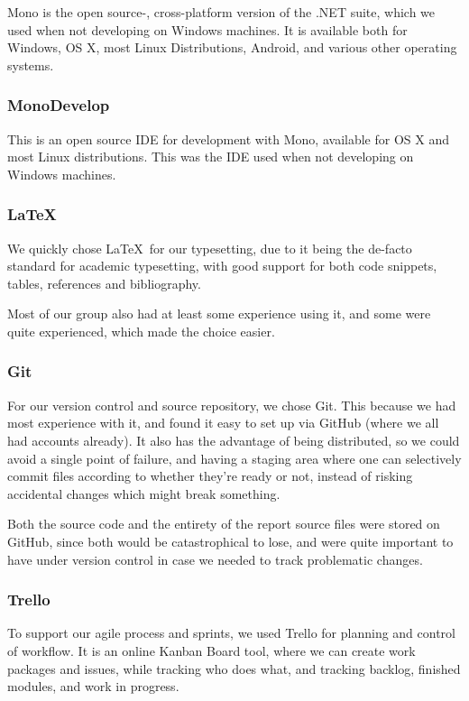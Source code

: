 Mono is the open source-, cross-platform version of the .NET suite, which we used when not developing on Windows machines. It is available both for Windows, OS X, most Linux Distributions, Android, and various other operating systems.

\subsubsection{MonoDevelop}
This is an open source IDE for development with Mono, available for OS X and most Linux distributions. This was the IDE used when not developing on Windows machines.

\subsubsection{\LaTeX}
We quickly chose \LaTeX \ for our typesetting, due to it being the de-facto standard for academic typesetting, with good support for both code snippets, tables, references and bibliography.

Most of our group also had at least some experience using it, and some were quite experienced, which made the choice easier.

\subsubsection{Git}
For our version control and source repository, we chose Git. This because we had most experience with it, and found it easy to set up via GitHub (where we all had accounts already). It also has the advantage of being distributed, so we could avoid a single point of failure, and having a staging area where one can selectively commit files according to whether they're ready or not, instead of risking accidental changes which might break something.

Both the source code and the entirety of the report source files were stored on GitHub, since both would be catastrophical to lose, and were quite important to have under version control in case we needed to track problematic changes.

\subsubsection{Trello}
To support our agile process and sprints, we used Trello for planning and control of workflow. It is an online Kanban Board tool, where we can create work packages and issues, while tracking who does what, and tracking backlog, finished modules, and work in progress.

